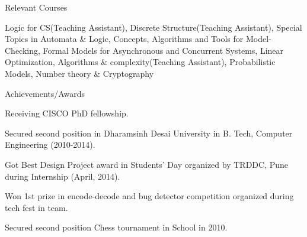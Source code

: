 \documentclass{resume} %
\begin{document}



\begin{rSection}{Relevant Courses}

Logic for CS(Teaching Assistant), Discrete Structure(Teaching Assistant), Special Topics in Automata \& Logic, Concepts, Algorithms and Tools for Model-Checking, Formal Models for Asynchronous and Concurrent Systems, Linear Optimization, Algorithms \& complexity(Teaching Assistant), Probabilistic Models, Number theory \& Cryptography

\end{rSection}



\begin{rSection}{Achievements/Awards}

\begin{rSubsection}{}{}{}{}
\item Receiving CISCO PhD fellowship.
\item Secured second position in Dharamsinh Desai University in B. Tech, Computer Engineering (2010-2014).
\item Got Best Design Project award in Students' Day organized by TRDDC, Pune during Internship (April, 2014).
\item Won 1st prize in encode-decode and bug detector competition organized during tech fest in team.
\item Secured second position Chess tournament in School in 2010.

\end{rSubsection}
\end{rSection}


%
%
%
%
\end{document}
